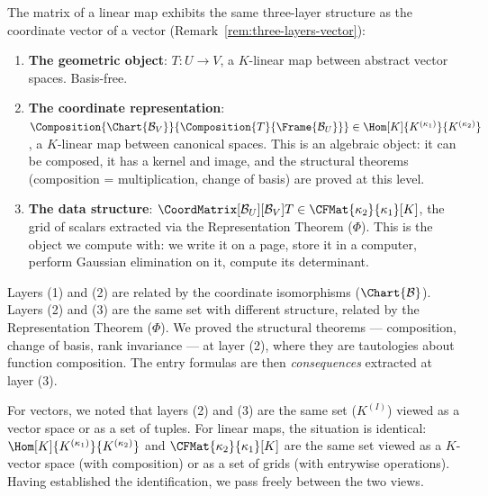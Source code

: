 \begin{remark}\label{rem:three-layers-map}
    The matrix of a linear map exhibits the same three-layer structure as the coordinate
    vector of a vector (Remark~\ref{rem:three-layers-vector}):
    \begin{enumerate}
        \item \textbf{The geometric object}: $T: U \to V$, a $K$-linear map between abstract
              vector spaces. Basis-free.
        \item \textbf{The coordinate representation}:
              $\Composition{\Chart{\mathcal{B}_V}}{\Composition{T}{\Frame{\mathcal{B}_U}}}
              \in \Hom[K]{K^{(\kappa_1)}}{K^{(\kappa_2)}}$, a $K$-linear map between canonical
              spaces. This is an algebraic object: it can be composed, it has a kernel and
              image, and the structural theorems (composition = multiplication, change of basis)
              are proved at this level.
        \item \textbf{The data structure}:
              $\CoordMatrix[\mathcal{B}_U][\mathcal{B}_V]{T}
              \in \CFMat{\kappa_2}{\kappa_1}[K]$, the grid of scalars extracted via the
              Representation Theorem ($\Phi$). This is the object we compute with: we write it
              on a page, store it in a computer, perform Gaussian elimination on it, compute
              its determinant.
    \end{enumerate}
    Layers (1) and (2) are related by the coordinate isomorphisms ($\Chart{\mathcal{B}}$).
    Layers (2) and (3) are the same set with different structure, related by the Representation
    Theorem ($\Phi$). We proved the structural theorems --- composition, change of basis, rank
    invariance --- at layer (2), where they are tautologies about function composition. The
    entry formulas are then \emph{consequences} extracted at layer (3).

    For vectors, we noted that layers (2) and (3) are the same set ($K^{(I)}$) viewed as a
    vector space or as a set of tuples. For linear maps, the situation is identical:
    $\Hom[K]{K^{(\kappa_1)}}{K^{(\kappa_2)}}$ and $\CFMat{\kappa_2}{\kappa_1}[K]$ are the
    same set viewed as a $K$-vector space (with composition) or as a set of grids (with
    entrywise operations). Having established the identification, we pass freely between the
    two views.
\end{remark}

